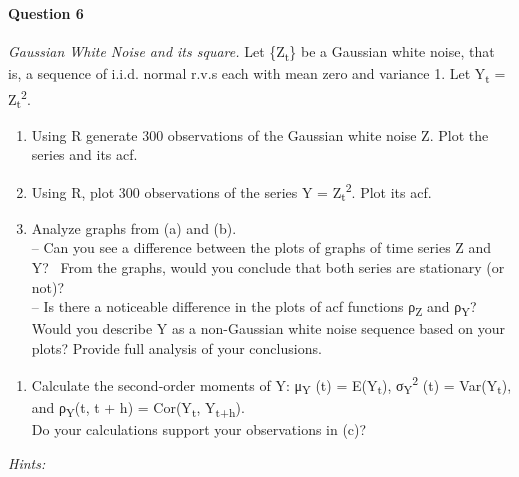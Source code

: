 \documentclass[
]{article}
\providecommand{\tightlist}{%
  \setlength{\itemsep}{0pt}\setlength{\parskip}{0pt}}
\begin{document}
\hypertarget{question-6}{%
\paragraph{Question 6}\label{question-6}}

\emph{Gaussian White Noise and its square.} Let \{Z\textsubscript{t}\}
be a Gaussian white noise, that is, a sequence of i.i.d. normal r.v.s
each with mean zero and variance 1. Let Y\textsubscript{t} =
Z\textsubscript{t}\textsuperscript{2}.\\

\setlength{\leftskip}{2cm}

\begin{enumerate}
\def\labelenumi{(\alph{enumi})}
\item
  Using R generate 300 observations of the Gaussian white noise Z. Plot
  the series and its acf.
\item
  Using R, plot 300 observations of the series Y =
  Z\textsubscript{t}\textsuperscript{2}. Plot its acf.\\
\item
  Analyze graphs from (a) and (b).\\
  -- Can you see a difference between the plots of graphs of time series
  Z and Y?~ From the graphs, would you conclude that both series are
  stationary (or not)?\\
  -- Is there a noticeable difference in the plots of acf functions
  ρ\textsubscript{Z} and ρ\textsubscript{Y}?~ Would you describe Y as a
  non-Gaussian white noise sequence based on your plots? Provide full
  analysis of your conclusions.
\end{enumerate}

\setlength{\leftskip}{0cm}

\setlength{\leftskip}{2cm}

\begin{enumerate}
\def\labelenumi{(\alph{enumi})}
\setcounter{enumi}{3}
\tightlist
\item
  Calculate the second-order moments of Y: μ\textsubscript{Y} (t) =
  E(Y\textsubscript{t}), σ\textsubscript{Y}\textsuperscript{2} (t) =
  Var(Y\textsubscript{t}), and ρ\textsubscript{Y}(t, t + h) =
  Cor(Y\textsubscript{t}, Y\textsubscript{t+h}).\\
  Do your calculations support your observations in (c)?\\
\end{enumerate}

\emph{Hints:}\\
\end{document}
